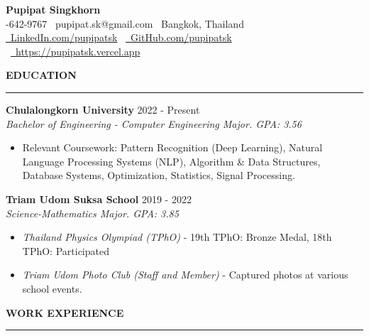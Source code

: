 \documentclass[a4paper, 11pt]{article}
\begin{document}
\begin{center}
    {\Large \textbf{Pupipat Singkhorn}} \\
    -642-9767 \textbullet\ pupipat.sk@gmail.com \textbullet\ Bangkok, Thailand
    \\
    \href{www.linkedin.com/in/pupipatsk}{\faLinkedin\ LinkedIn.com/pupipatsk}
    \textbullet\ \href{https://github.com/pupipatsk}{\faGithub\ GitHub.com/pupipatsk}
    \textbullet\ \href{https://pupipatsk.vercel.app}{\faGlobe\ https://pupipatsk.vercel.app}
\end{center}

\textbf{EDUCATION}
\vspace{5pt}
{\hrule}
\vspace{6pt}

\textbf{Chulalongkorn University} \hfill 2022 - Present\\
\textit{Bachelor of Engineering - Computer Engineering Major. GPA: 3.56}
\begin{itemize}[noitemsep, topsep=0pt, partopsep=0pt, parsep=0pt, leftmargin=20pt]
    \item Relevant Coursework: Pattern Recognition (Deep Learning), Natural Language Processing Systems (NLP), Algorithm \& Data Structures, Database Systems, Optimization, Statistics, Signal Processing.
\end{itemize}

\vspace{2pt}

\textbf{Triam Udom Suksa School} \hfill 2019 - 2022\\
\textit{Science-Mathematics Major. GPA: 3.85}
\begin{itemize}[noitemsep, topsep=0pt, partopsep=0pt, parsep=0pt, leftmargin=20pt]
    \item \textit{Thailand Physics Olympiad (TPhO)} - 19th TPhO: Bronze Medal, 18th TPhO: Participated
    \item \textit{Triam Udom Photo Club (Staff and Member)} - Captured photos at various school events.
\end{itemize}

\vspace{6pt}
\textbf{WORK EXPERIENCE}
\vspace{5pt}
{\hrule}
\vspace{6pt}
\end{document}
